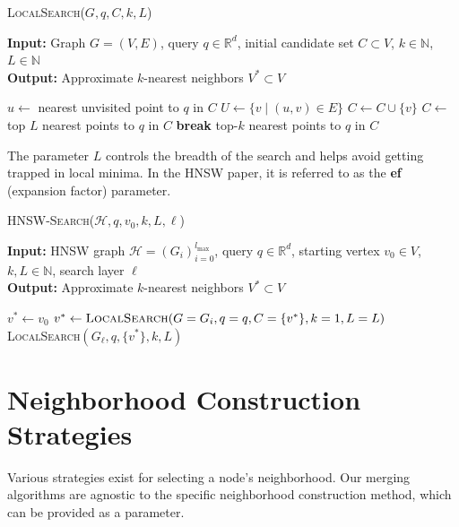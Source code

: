 \documentclass{article}
\begin{document}
\begin{algorithm}
\caption{\textsc{LocalSearch}($G, q, C, k, L$)}\label{alg:local_search}
\textbf{Input:} Graph $G = (V, E)$, query $q \in \mathbb{R}^d$, initial candidate set $C \subset V$, $k \in \mathbb{N}$, $L \in \mathbb{N}$ \\
\textbf{Output:} Approximate $k$-nearest neighbors $V^* \subset V$
\begin{algorithmic}[1]
    \State $u \gets$ nearest unvisited point to $q$ in $C$
    \State $U \gets \{v \mid (u, v) \in E\}$
            \State $C \gets C \cup \{v\}$
        \EndIf
    \EndFor
        \State $C \gets$ top $L$ nearest points to $q$ in $C$
    \EndIf
        \State \textbf{break}
    \EndIf
\EndWhile
\State \Return top-$k$ nearest points to $q$ in $C$
\end{algorithmic}
\end{algorithm}

The parameter $L$ controls the breadth of the search and helps avoid getting trapped in local minima. In the HNSW paper, it is referred to as the \textbf{ef} (expansion factor) parameter.

\begin{algorithm}
\caption{\textsc{HNSW-Search}($\mathcal{H}, q, v_0, k, L, \ell$)}\label{alg:hnsw_search}
\textbf{Input:} HNSW graph $\mathcal{H} = (G_i)_{i=0}^{l_{\max}}$, query $q \in \mathbb{R}^d$, starting vertex $v_0 \in V$, $k, L \in \mathbb{N}$, search layer $\ell$ \\
\textbf{Output:} Approximate $k$-nearest neighbors $V^* \subset V$
\begin{algorithmic}[1]
\State $v^* \gets v_0$ 
    \State $v^* \gets \textsc{LocalSearch}(G=G_i, q=q, C=\{v^*\}, k=1, L=L)$
\EndFor
\State \Return \textsc{LocalSearch}$(G_\ell, q, \{v^*\}, k, L)$
\end{algorithmic}
\end{algorithm}

\section{Neighborhood Construction Strategies}

Various strategies exist for selecting a node's neighborhood. Our merging algorithms are agnostic to the specific neighborhood construction method, which can be provided as a parameter.
\end{document}
